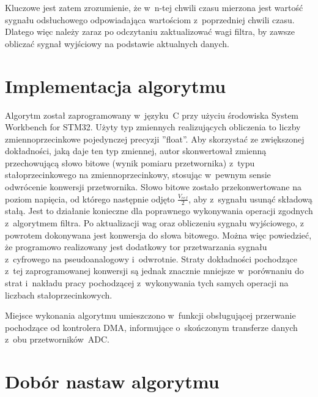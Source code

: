 Kluczowe jest zatem zrozumienie, że w~n-tej chwili czasu mierzona jest wartość sygnału odsłuchowego odpowiadająca wartościom z~poprzedniej chwili czasu. Dlatego więc należy zaraz po odczytaniu zaktualizować wagi filtra, by zawsze obliczać sygnał wyjściowy na podstawie aktualnych danych.
\section{Implementacja algorytmu}
Algorytm został zaprogramowany w~języku~C przy użyciu środowiska System Workbench for STM32. Użyty typ zmiennych realizujących obliczenia to liczby zmiennoprzecinkowe pojedynczej precyzji ''float''. Aby skorzystać ze zwiększonej dokładności, jaką daje ten typ zmiennej, autor skonwertował zmienną przechowującą słowo bitowe (wynik pomiaru przetwornika) z~typu stałoprzecinkowego na zmiennoprzecinkowy, stosując w~pewnym sensie odwrócenie konwersji przetwornika. Słowo bitowe zostało przekonwertowane na poziom napięcia, od którego następnie odjęto $ \frac{V_{ref}}{2} $, aby z~sygnału usunąć składową stałą. Jest to działanie konieczne dla poprawnego wykonywania operacji zgodnych z~algorytmem filtra. Po aktualizacji wag oraz obliczeniu sygnału wyjściowego, z powrotem dokonywana jest konwersja do słowa bitowego. Można więc powiedzieć, że programowo realizowany jest dodatkowy tor przetwarzania sygnału z~cyfrowego na pseudoanalogowy i~odwrotnie. Straty dokładności pochodzące z~tej zaprogramowanej konwersji są jednak znacznie mniejsze w~porównaniu do strat i~nakładu pracy pochodzącej z~wykonywania tych samych operacji na liczbach stałoprzecinkowych.

Miejsce wykonania algorytmu umieszczono w~funkcji obsługującej przerwanie pochodzące od kontrolera DMA, informujące o~skończonym transferze danych z~obu przetworników~ADC.
\section{Dobór nastaw algorytmu}